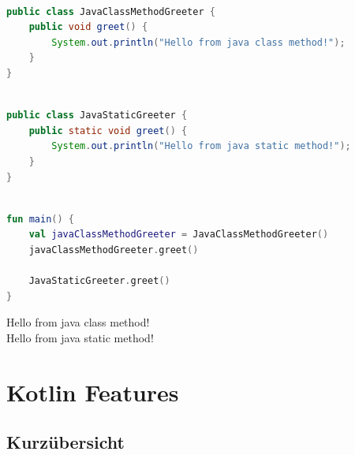 \documentclass[11pt]{article}
\begin{document}
    \begin{lstlisting}[language=Java, caption={JavaClassMethodGreeter.java}]

public class JavaClassMethodGreeter {
    public void greet() {
        System.out.println("Hello from java class method!");
    }
}
    \end{lstlisting}

    \begin{lstlisting}[language=Java, caption={JavaStaticGreeter.java}]

public class JavaStaticGreeter {
    public static void greet() {
        System.out.println("Hello from java static method!");
    }
}

    \end{lstlisting}

    \begin{lstlisting}[language=Kotlin, caption={Main.kt}]

fun main() {
    val javaClassMethodGreeter = JavaClassMethodGreeter()
    javaClassMethodGreeter.greet()

    JavaStaticGreeter.greet()
}
    \end{lstlisting}

    \begin{tcolorbox}[colback=black!5!white, colframe=black, title=Ausgabe]
        Hello from java class method!\\
        Hello from java static method!\\
    \end{tcolorbox}

    \section{Kotlin Features}

    \subsection{Kurzübersicht}
\end{document}
